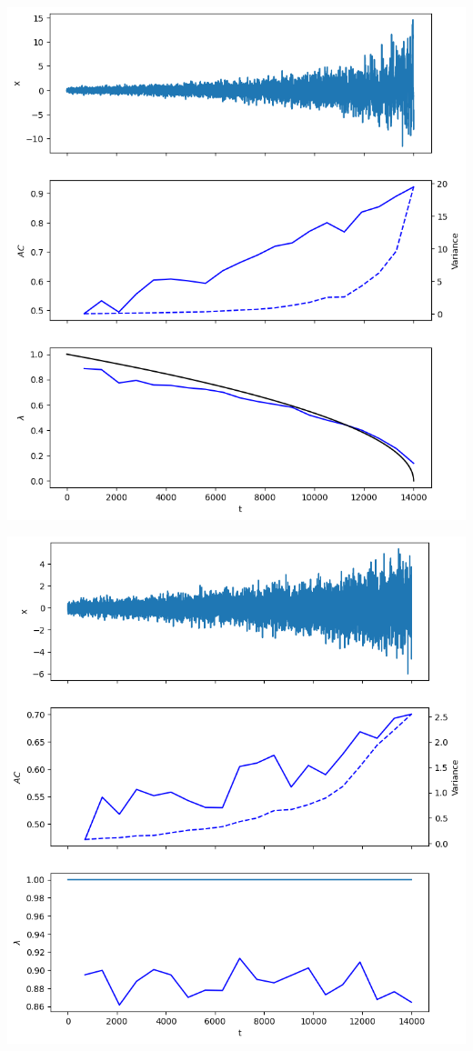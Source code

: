 \documentclass[%
thesis=student,%
coverpage=false,%
titlepage=false,%
headmarks=true, %
german,%
font=libertine, %
math=newpxtx, %
BCOR=5mm,%
coverBCOR=11mm%
]{tumbook}
\begin{document}
\begin{minipage}{0.49\textwidth}
        \centering
        \includegraphics[width=\textwidth]{figures/true_positive.png}
    \end{minipage}
    \hfill
    \begin{minipage}{0.49\textwidth}
        \centering
        \includegraphics[width=\textwidth]{figures/false_positives.png}
    \end{minipage}
\end{document}
